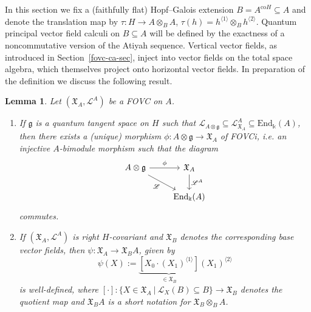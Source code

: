 \documentclass{article}
\newtheorem{lemma}[thm]{Lemma}
\theoremstyle{definition}
\begin{document}
In this section we fix a (faithfully flat) Hopf--Galois extension $B=A^{\mathrm{co}H}\subseteq A$ and denote the translation map by $\tau\colon H\to A\otimes_BA$, $\tau(h)=h^{\langle 1\rangle}\otimes_Bh^{\langle 2\rangle}$. Quantum principal vector field calculi on $B\subseteq A$ will be defined by the exactness of a noncommutative version of the Atiyah sequence. Vertical vector fields, as introduced in Section~\ref{fovc-ca-sec}, inject into vector fields on the total space algebra, which themselves project onto horizontal vector fields. In preparation of the definition we discuss the following result.
\begin{lemma}\label{lem:sequence}
	Let $(\mathfrak{X}_A,\mathscr{L}^A)$ be a FOVC on $A$.
	\begin{enumerate}
		\item[i.)] If $\mathfrak{g}$ is a quantum tangent space on $H$ such that $\mathscr{L}_{A\otimes\mathfrak{g}}\subseteq\mathscr{L}^A_{\mathfrak{X}_A}\subseteq\mathrm{End}_\Bbbk(A)$, then there exists a (unique) morphism $\phi\colon A\otimes\mathfrak{g}\to\mathfrak{X}_A$ of FOVCi, i.e. an injective $A$-bimodule morphism such that the diagram
		\begin{equation}\label{phi-fovc}
			\begin{tikzcd}
				A\otimes\mathfrak{g}\arrow{dr}[swap]{\mathscr{L}} \arrow{r}{\phi}
				& \mathfrak{X}_A \arrow{d}{\mathscr{L}^A}\\
				& \mathrm{End}_\Bbbk(A)
			\end{tikzcd}
		\end{equation}
		commutes.
		\item[ii.)] If $(\mathfrak{X}_A,\mathscr{L}^A)$ is right $H$-covariant and $\mathfrak{X}_B$ denotes the corresponding base vector fields, then $\psi\colon\mathfrak{X}_A\to\mathfrak{X}_BA$, given by
		\begin{equation}\label{chidef}
			\psi(X):=\underbrace{[X_0\cdot(X_1)^{\langle 1\rangle}]}_{\in\mathfrak{X}_B}(X_1)^{\langle 2\rangle}
		\end{equation}
		is well-defined, where $[\cdot]\colon\{X\in\mathfrak{X}_A~|~\mathscr{L}_X(B)\subseteq B\}\to\mathfrak{X}_B$ denotes the quotient map and $\mathfrak{X}_BA$ is a short notation for $\mathfrak{X}_B \otimes_B A$.
	\end{enumerate}
\end{lemma}
\end{document}
